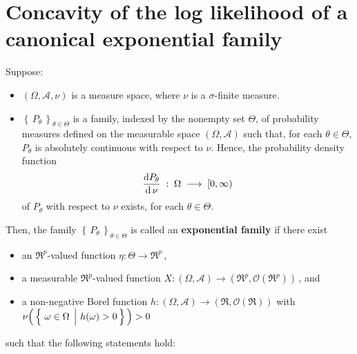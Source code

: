 

\section{Concavity of the log likelihood of a {\color{red}canonical} exponential family}
\setcounter{theorem}{0}
\setcounter{equation}{0}

\renewcommand{\theenumi}{\roman{enumi}}
\renewcommand{\labelenumi}{\textnormal{(\theenumi)}$\;\;$}


\begin{definition}
\mbox{}\vskip 0.1cm
\noindent
Suppose:
\begin{itemize}
\item
	$(\Omega,\mathcal{A},\nu)$ is a measure space, where $\nu$ is a $\sigma$-finite measure.
\item
	$\left\{\,P_{\theta}\,\right\}_{\theta \in \Theta}$ is a family, indexed by the nonempty set $\Theta$,
	of probability measures defined on the measurable space $(\Omega,\mathcal{A})$ such that,
	for each $\theta \in \Theta$, $P_{\theta}$ is absolutely continuous with respect to $\nu$.
	Hence, the probability density function
	\begin{equation*}
	\dfrac{\textnormal{d} P_{\theta}}{\textnormal{d}\,\nu} \; : \; \Omega \; \longrightarrow \; [0,\infty)
	\end{equation*}
	of $P_{\theta}$ with respect to $\nu$ exists, for each $\theta \in \Theta$.
\end{itemize}
Then, the family $\left\{\,P_{\theta}\,\right\}_{\theta \in \Theta}$ is called an \textbf{exponential family} if
there exist
\begin{itemize}
\item
	an $\Re^{p}$-valued function $\eta : \Theta \longrightarrow \Re^{p}$\,,
\item
	a measurable $\Re^{p}$-valued function $X : (\Omega,\mathcal{A}) \longrightarrow (\Re^{p},\mathcal{O}(\Re^{p}))$\,, and
\item
	a non-negative Borel function $h : (\Omega,\mathcal{A}) \longrightarrow (\Re,\mathcal{O}(\Re))$ with
	\,$\nu\!\left(\,\left\{\,\left.\omega\overset{{\color{white}.}}{\in}\Omega\,\;\right\vert\,h(\omega) > 0\,\right\}\,\right) > 0$
\end{itemize}
such that the following statements hold:

\end{definition}

